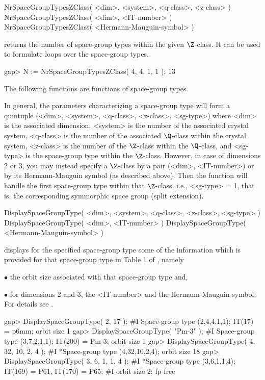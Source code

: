 
\>NrSpaceGroupTypesZClass( <dim>, <system>, <q-class>, <z-class> )
\>NrSpaceGroupTypesZClass( <dim>, <IT-number> )
\>NrSpaceGroupTypesZClass( <Hermann-Mauguin-symbol> )

returns the number of space-group types within the given $\Z$-class.
It can be used to formulate loops over the space-group types.

\beginexample
gap> N := NrSpaceGroupTypesZClass( 4, 4, 1, 1 );
13
\endexample

The following functions are functions of space-group types.

In general, the parameters characterizing a space-group type will form
a quintuple (<dim>, <system>, <q-class>, <z-class>, <sg-type>) where
<dim> is the associated dimension, <system> is the number of the
associated crystal system, <q-class> is the number of the associated
$\Q$-class within the crystal system, <z-class> is the number of the
$\Z$-class within the $\Q$-class, and <sg-type> is the space-group
type within the $\Z$-class.  However, in case of dimensions 2 or 3,
you may instead specify a $\Z$-class by a pair (<dim>, <IT-number>)
or by its Hermann-Mauguin symbol (as described above).  Then the
function will handle the first space-group type within that
$\Z$-class, i.e., <sg-type> = 1, that is, the corresponding
symmorphic space group (split extension).

\>DisplaySpaceGroupType( <dim>, <system>, <q-class>, <z-class>, <sg-type> )
\>DisplaySpaceGroupType( <dim>, <IT-number> )
\>DisplaySpaceGroupType( <Hermann-Mauguin-symbol> )

displays for the specified space-group type some of the information
which is provided for that space-group type in Table 1 of
\cite{BBNWZ78}, namely
\beginlist%
\item{$\bullet$} the orbit size associated with that space-group type and,
\item{$\bullet$} for dimensions  2 and 3,  the <IT-number>  and  the 
    Hermann-Mauguin symbol.
\endlist
For details see \cite{BBNWZ78}.

\beginexample
gap> DisplaySpaceGroupType( 2, 17 );
#I     Space-group type (2,4,4,1,1); IT(17) = p6mm; orbit size 1
gap> DisplaySpaceGroupType( "Pm-3" );
#I     Space-group type (3,7,2,1,1); IT(200) = Pm-3; orbit size 1
gap> DisplaySpaceGroupType( 4, 32, 10, 2, 4 );
#I    *Space-group type (4,32,10,2,4); orbit size 18
gap> DisplaySpaceGroupType( 3, 6, 1, 1, 4 );
#I    *Space-group type (3,6,1,1,4); IT(169) = P61, IT(170) = P65;
#I      orbit size 2; fp-free
\endexample

